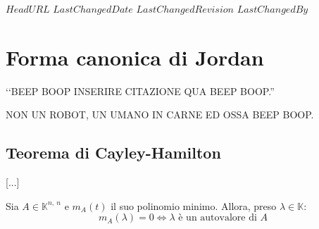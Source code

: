 \svnidlong
{$HeadURL$}
{$LastChangedDate$}
{$LastChangedRevision$}
{$LastChangedBy$}

\chapter{Forma canonica di Jordan}

\begin{introduction}
	‘‘BEEP BOOP INSERIRE CITAZIONE QUA BEEP BOOP.''
	\begin{flushright}
		\textsc{NON UN ROBOT,} UN UMANO IN CARNE ED OSSA BEEP BOOP.
	\end{flushright}
\end{introduction}

\section{Teorema di Cayley-Hamilton}
\begin{center}
	[...]
\end{center}
\begin{theorema}
	Sia $A\in \mathbb{K}^{n,\ n}$ e $m_A\left(t\right)$ il suo polinomio minimo. Allora, preso $\lambda\in\mathbb{K}$:
	\begin{equation}
		m_A\left(\lambda\right)=0\iff \lambda\text{ è un autovalore di }A
	\end{equation}
\vspace{-6mm}
\end{theorema}
